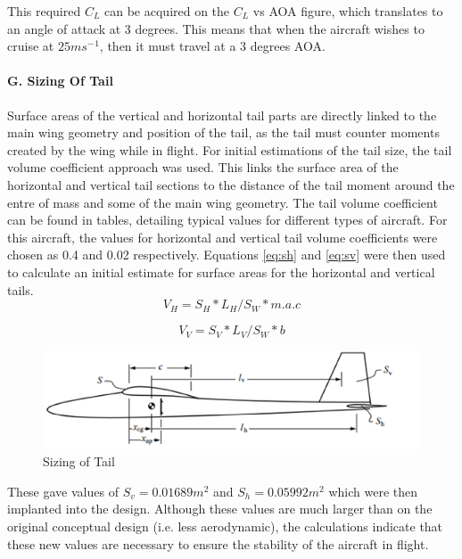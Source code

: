 \documentclass[12pt]{article}
\begin{document}
\noindent This required $C{_L}$ can be acquired on the $C{_L}$  vs AOA figure, which translates to an angle of attack at 3 degrees. This means that when the aircraft wishes to cruise at $25ms{{^-}^1}$, then it must travel at a 3 degrees AOA. \\

\paragraph{G. Sizing Of Tail} Surface areas of the vertical and horizontal tail parts are directly linked to the main wing geometry and position of the tail, as the tail must counter moments created by the wing while in flight. For initial estimations of the tail size, the tail volume coefficient approach was used. This links the surface area of the horizontal and vertical tail sections to the distance of the tail moment around the entre of mass and some of the main wing geometry. The tail volume coefficient can be found in tables, detailing typical values for different types of aircraft. For this aircraft, the values for horizontal and vertical tail volume coefficients were chosen as 0.4 and 0.02 respectively. Equations \ref{eq:sh} and \ref{eq:sv} were then used to calculate an initial estimate for surface areas for the horizontal and vertical tails. \\

\begin{equation} \label{eq:sh}
V_H = S_H * L_H/S_W * m.a.c
\end{equation}

\begin{equation} \label{eq:sv}
V_V = S_V * L_V/S_W * b
\end{equation}

\begin{figure}[H]
    \includegraphics[width=18cm, scale=1]{tailsize.png}
    \centering
    \caption{Sizing of Tail\cite{TAILSIZEREF}}
    \label{fig:tailsize}
\end{figure}
    
\noindent These gave values of $S{_v}=0.01689m{^2}$ and $S{_h}=0.05992m{^2}$ which were then implanted into the design. Although these values are much larger than on the original conceptual design (i.e. less aerodynamic), the calculations indicate that these new values are necessary to ensure the stability of the aircraft in flight. \\
\end{document}
